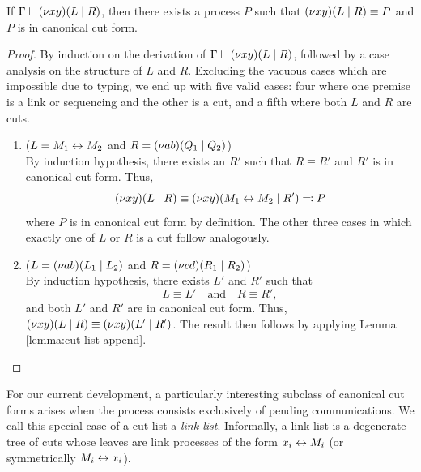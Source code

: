 \begin{lemma} \label{lemma:canonical-cut-forms}
  If $\Gamma \vdash (\nu x y)(L \mid R)$, then there exists
  a process $P$ such that $(\nu x y)(L \mid R) \equiv P$ and $P$
  is in canonical cut form.
\end{lemma}
\begin{proof}
  By induction on the derivation of $\Gamma \vdash (\nu x y)(L \mid R)$, followed
  by a case analysis on the structure of $L$ and $R$. Excluding the vacuous
  cases which are impossible due to typing, we end up with five valid cases:
  four where one premise is a link or sequencing and the other is a cut,
  and a fifth where both $L$ and $R$ are cuts.

  \begin{enumerate}[itemsep=1em, label=Case:, leftmargin=*]
  \item ($L = M_1 \leftrightarrow M_2$ and $R = (\nu a b)(Q_1 \mid Q_2)$) \\
    By induction hypothesis, there exists an $R'$ such that $R \equiv R'$ and
    $R'$ is in canonical cut form. Thus,
    \[
      (\nu x y)(L \mid R) \equiv (\nu x y)(M_1 \leftrightarrow M_2 \mid R') \eqcolon P
    \]
    where $P$ is in canonical cut form by definition.
    The other three cases in which exactly one of $L$ or $R$
    is a cut follow analogously.

  \item ($L = (\nu a b)(L_1 \mid L_2)$ and $R = (\nu c d)(R_1 \mid R_2)$) \\
    By induction hypothesis, there exists $L'$ and $R'$ such that
    \[
      L \equiv L' \quad \text{and} \quad R \equiv R',
    \]
    and both $L'$ and $R'$ are in canonical cut form.
    Thus, $(\nu x y)(L \mid R) \equiv (\nu x y)(L' \mid R')$. The result then
    follows by applying Lemma \ref{lemma:cut-list-append}.

    \qedhere
  \end{enumerate}
\end{proof}

For our current development, a particularly interesting subclass
of canonical cut forms arises when the process consists exclusively of
pending communications. We call this special case of a cut list a
\emph{link list}. Informally, a link list is a degenerate tree of cuts whose leaves
are link processes of the form $x_i \leftrightarrow M_i$ (or symmetrically $M_i \leftrightarrow x_i$).

